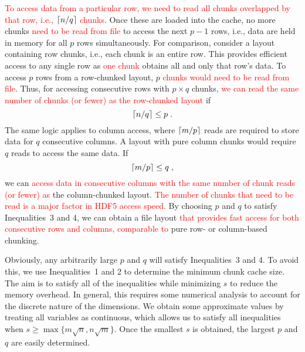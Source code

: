 \documentclass{article}
\newcommand{\revised}[1]{\textcolor{red}{#1}}
\begin{document}
\revised{To access data from a particular row, we need to read all chunks overlapped by that row, i.e., $\left \lceil n/q \right \rceil$ chunks}.
Once these are loaded into the cache, no more chunks \revised{need to be read from file} to access the next $p-1$ rows, i.e., data are held in memory for all $p$ rows simultaneously.
For comparison, consider a layout containing row chunks, i.e., each chunk is an entire row.
This provides efficient access to any single row as \revised{one chunk} obtains all and only that row's data.
To access $p$ rows from a row-chunked layout, $p$ \revised{chunks would need to be read from file}.
Thus, for accessing consecutive rows with $p \times q$ chunks, \revised{we can read the same number of chunks (or fewer) as the row-chunked layout} if 
\begin{equation}
\left \lceil n/q \right \rceil \le p \;.
\end{equation}
The same logic applies to column access, where $\left \lceil m/p \right \rceil$ reads are required to store data for $q$ consecutive columns.
A layout with pure column chunks would require $q$ reads to access the same data.
If 
\begin{equation}
\left \lceil m/p \right \rceil \le q \;,
\end{equation}
we can \revised{access data in consecutive columns with the same number of chunk reads (or fewer) as} the column-chunked layout. 
\revised{The number of chunks that need to be read is a major factor in HDF5 access speed.}
By choosing $p$ and $q$ to satisfy Inequalities~3 and 4, we can obtain a file layout \revised{that provides fast access for both consecutive rows and columns, comparable to} pure row- or column-based chunking.

Obviously, any arbitrarily large $p$ and $q$ will satisfy Inequalities~3 and 4.
To avoid this, we use Inequalities~1 and 2 to determine the minimum chunk cache size.
The aim is to satisfy all of the inequalities while minimizing $s$ to reduce the memory overhead.
In general, this requires some numerical analysis to account for the discrete nature of the dimensions.
We obtain some approximate values by treating all variables as continuous, which allows us to satisfy all inequalities when $s \ge \max\{m\sqrt{n}, n\sqrt{m}\}$.
Once the smallest $s$ is obtained, the largest $p$ and $q$ are easily determined.


\end{document}
